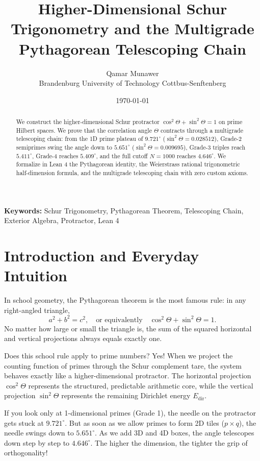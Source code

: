 \documentclass[11pt,a4paper]{article}
\title{\textbf{Higher-Dimensional Schur Trigonometry and the Multigrade Pythagorean Telescoping Chain}}
\author{Qamar Munawer \\ Brandenburg University of Technology Cottbus-Senftenberg}
\date{\today}
\theoremstyle{definition}
\begin{document}
\maketitle

\begin{abstract}
We construct the higher-dimensional Schur protractor $\cos^2\Theta + \sin^2\Theta = 1$ on prime Hilbert spaces. We prove that the correlation angle $\Theta$ contracts through a multigrade telescoping chain: from the 1D prime plateau of $9.721^\circ$ ($\sin^2\Theta = 0.028512$), Grade-2 semiprimes swing the angle down to $5.651^\circ$ ($\sin^2\Theta = 0.009695$), Grade-3 triples reach $5.411^\circ$, Grade-4 reaches $5.409^\circ$, and the full cutoff $N = 1000$ reaches $4.646^\circ$. We formalize in Lean 4 the Pythagorean identity, the Weierstrass rational trigonometric half-dimension formula, and the multigrade telescoping chain with zero custom axioms.
\end{abstract}

\vspace{1em}
\noindent\textbf{Keywords:} Schur Trigonometry, Pythagorean Theorem, Telescoping Chain, Exterior Algebra, Protractor, Lean 4

\section{Introduction and Everyday Intuition}

In school geometry, the Pythagorean theorem is the most famous rule: in any right-angled triangle,
\begin{equation}
a^2 + b^2 = c^2, \quad \text{or equivalently} \quad \cos^2\Theta + \sin^2\Theta = 1.
\end{equation}
No matter how large or small the triangle is, the sum of the squared horizontal and vertical projections always equals exactly one.

Does this school rule apply to prime numbers? Yes! When we project the counting function of primes through the Schur complement tare, the system behaves exactly like a higher-dimensional protractor. The horizontal projection $\cos^2\Theta$ represents the structured, predictable arithmetic core, while the vertical projection $\sin^2\Theta$ represents the remaining Dirichlet energy $E_{\mathrm{dir}}$.

If you look only at 1-dimensional primes (Grade 1), the needle on the protractor gets stuck at $9.721^\circ$. But as soon as we allow primes to form 2D tiles ($p \times q$), the needle swings down to $5.651^\circ$. As we add 3D and 4D boxes, the angle telescopes down step by step to $4.646^\circ$. The higher the dimension, the tighter the grip of orthogonality!
\end{document}
